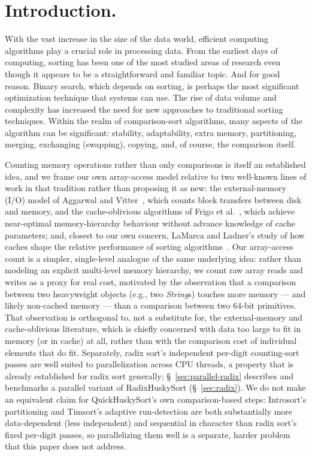 \documentclass[twoside,leqno,twocolumn]{article}
\begin{document}
\section{Introduction.}
With the vast increase in the size of the data world, efficient computing algorithms play a crucial role in processing data.
From the earliest days of computing,
sorting has been one of the most studied areas of research even though it appears to be a straightforward and familiar topic.
And for good reason.
Binary search, which depends on sorting, is perhaps the most significant optimization technique that systems can use.
The rise of data volume and complexity has increased the need for new approaches to traditional sorting techniques.
Within the realm of comparison-sort algorithms, many aspects of the algorithm can be significant:
stability, adaptability, extra memory, partitioning, merging, exchanging (swapping), copying, and, of course, the comparison itself.

Counting memory operations rather than only comparisons is itself an established idea,
and we frame our own array-access model relative to two well-known lines of work in that tradition rather than proposing it as new:
the external-memory (I/O) model of Aggarwal and Vitter~\cite{10.1145/48529.48535},
which counts block transfers between disk and memory, and the cache-oblivious algorithms of Frigo et al.~\cite{814600},
which achieve near-optimal memory-hierarchy behaviour without advance knowledge of cache parameters;
and, closest to our own concern, LaMarca and Ladner's study of how caches shape the relative performance
of sorting algorithms~\cite{LAMARCA199966}.
Our array-access count is a simpler, single-level analogue of the same underlying idea:
rather than modeling an explicit multi-level memory hierarchy, we count raw array reads and writes as a proxy for real cost,
motivated by the observation that a comparison between two heavyweight objects (e.g., two \textit{String}s)
touches more memory — and likely non-cached memory — than a comparison between two 64-bit primitives.
That observation is orthogonal to, not a substitute for, the external-memory and cache-oblivious literature,
which is chiefly concerned with data too large to fit in memory (or in cache) at all,
rather than with the comparison cost of individual elements that do fit.
Separately, radix sort's independent per-digit counting-sort passes are well suited to parallelization across CPU threads,
a property that is already established for radix sort generally;
\S~\ref{sec:parallel-radix} describes and benchmarks a parallel variant of RadixHuskySort (\S~\ref{sec:radix}).
We do not make an equivalent claim for QuickHuskySort's own comparison-based steps:
Introsort's partitioning and Timsort's adaptive run-detection are both substantially more data-dependent (less independent) and sequential
in character than radix sort's fixed per-digit passes,
so parallelizing them well is a separate, harder problem that this paper does not address.
\end{document}
